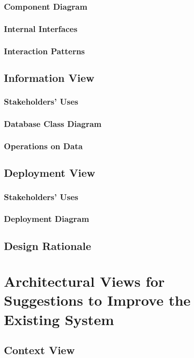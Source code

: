 \documentclass[a4paper]{article}
\begin{document}
    \subsubsection{Component Diagram}
    \subsubsection{Internal Interfaces}
    \lipsum[1-1]
    \subsubsection{Interaction Patterns}
    \lipsum[1-1]
    \subsection{Information View}
    \subsubsection{Stakeholders' Uses}
    \lipsum[1-1]
    \subsubsection{Database Class Diagram}
    \subsubsection{Operations on Data}
    \lipsum[1-1]
    \subsection{Deployment View}
    \subsubsection{Stakeholders' Uses}
    \lipsum[1-1]
    \subsubsection{Deployment Diagram}
    \subsection{Design Rationale}
    \lipsum[1-1]

    \section{Architectural Views for Suggestions to Improve the Existing System}
    \subsection{Context View}
\end{document}

